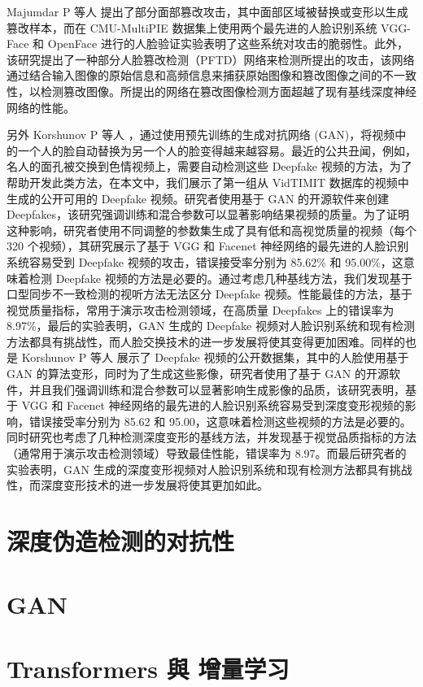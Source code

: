 Majumdar P 等人 \cite{majumdar2019evading} 提出了部分面部篡改攻击，其中面部区域被替换或变形以生成篡改样本，而在 CMU-MultiPIE 数据集上使用两个最先进的人脸识别系统 VGG-Face 和 OpenFace 进行的人脸验证实验表明了这些系统对攻击的脆弱性。此外，该研究提出了一种部分人脸篡改检测（PFTD）网络来检测所提出的攻击，该网络通过结合输入图像的原始信息和高频信息来捕获原始图像和篡改图像之间的不一致性，以检测篡改图像。所提出的网络在篡改图像检测方面超越了现有基线深度神经网络的性能。

另外 Korshunov P 等人 \cite{korshunov2018deepfakes}，通过使用预先训练的生成对抗网络 (GAN)，将视频中的一个人的脸自动替换为另一个人的脸变得越来越容易。最近的公共丑闻，例如，名人的面孔被交换到色情视频上，需要自动检测这些 Deepfake 视频的方法，为了帮助开发此类方法，在本文中，我们展示了第一组从 VidTIMIT 数据库的视频中生成的公开可用的 Deepfake 视频。研究者使用基于 GAN 的开源软件来创建 Deepfakes，该研究强调训练和混合参数可以显著影响结果视频的质量。为了证明这种影响，研究者使用不同调整的参数集生成了具有低和高视觉质量的视频（每个 320 个视频），其研究展示了基于 VGG 和 Facenet 神经网络的最先进的人脸识别系统容易受到 Deepfake 视频的攻击，错误接受率分别为 85.62\% 和 95.00\%，这意味着检测 Deepfake 视频的方法是必要的。通过考虑几种基线方法，我们发现基于口型同步不一致检测的视听方法无法区分 Deepfake 视频。性能最佳的方法，基于视觉质量指标，常用于演示攻击检测领域，在高质量 Deepfakes 上的错误率为 8.97\%，最后的实验表明，GAN 生成的 Deepfake 视频对人脸识别系统和现有检测方法都具有挑战性，而人脸交换技术的进一步发展将使其变得更加困难。同样的也是 Korshunov P 等人 \cite{korshunov2019vulnerability} 展示了 Deepfake 视频的公开数据集，其中的人脸使用基于 GAN 的算法变形，同时为了生成这些影像，研究者使用了基于 GAN 的开源软件，并且我们强调训练和混合参数可以显著影响生成影像的品质，该研究表明，基于 VGG 和 Facenet 神经网络的最先进的人脸识别系统容易受到深度变形视频的影响，错误接受率分别为 85.62 和 95.00，这意味着检测这些视频的方法是必要的。同时研究也考虑了几种检测深度变形的基线方法，并发现基于视觉品质指标的方法（通常用于演示攻击检测领域）导致最佳性能，错误率为 8.97。而最后研究者的实验表明，GAN 生成的深度变形视频对人脸识别系统和现有检测方法都具有挑战性，而深度变形技术的进一步发展将使其更加如此。


\section{深度伪造检测的对抗性}

\section{GAN}

\section{Transformers 與 增量学习}



